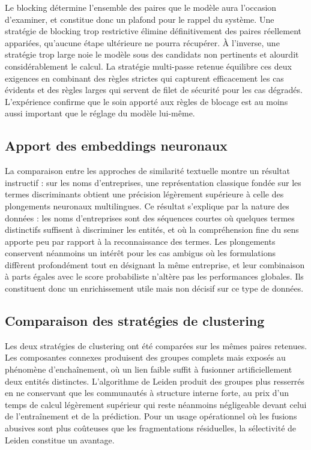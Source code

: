 Le blocking détermine l'ensemble des paires que le modèle aura l'occasion d'examiner, et constitue donc un plafond pour le rappel du système. Une stratégie de blocking trop restrictive élimine définitivement des paires réellement appariées, qu'aucune étape ultérieure ne pourra récupérer. À l'inverse, une stratégie trop large noie le modèle sous des candidats non pertinents et alourdit considérablement le calcul. La stratégie multi-passe retenue équilibre ces deux exigences en combinant des règles strictes qui capturent efficacement les cas évidents et des règles larges qui servent de filet de sécurité pour les cas dégradés. L'expérience confirme que le soin apporté aux règles de blocage est au moins aussi important que le réglage du modèle lui-même.

\subsection{Apport des embeddings neuronaux}

La comparaison entre les approches de similarité textuelle montre un résultat instructif : sur les noms d'entreprises, une représentation classique fondée sur les termes discriminants obtient une précision légèrement supérieure à celle des plongements neuronaux multilingues. Ce résultat s'explique par la nature des données : les noms d'entreprises sont des séquences courtes où quelques termes distinctifs suffisent à discriminer les entités, et où la compréhension fine du sens apporte peu par rapport à la reconnaissance des termes. Les plongements conservent néanmoins un intérêt pour les cas ambigus où les formulations diffèrent profondément tout en désignant la même entreprise, et leur combinaison à parts égales avec le score probabiliste n'altère pas les performances globales. Ils constituent donc un enrichissement utile mais non décisif sur ce type de données.

\subsection{Comparaison des stratégies de clustering}

Les deux stratégies de clustering ont été comparées sur les mêmes paires retenues. Les composantes connexes produisent des groupes complets mais exposés au phénomène d'enchaînement, où un lien faible suffit à fusionner artificiellement deux entités distinctes. L'algorithme de Leiden produit des groupes plus resserrés en ne conservant que les communautés à structure interne forte, au prix d'un temps de calcul légèrement supérieur qui reste néanmoins négligeable devant celui de l'entraînement et de la prédiction. Pour un usage opérationnel où les fusions abusives sont plus coûteuses que les fragmentations résiduelles, la sélectivité de Leiden constitue un avantage.

